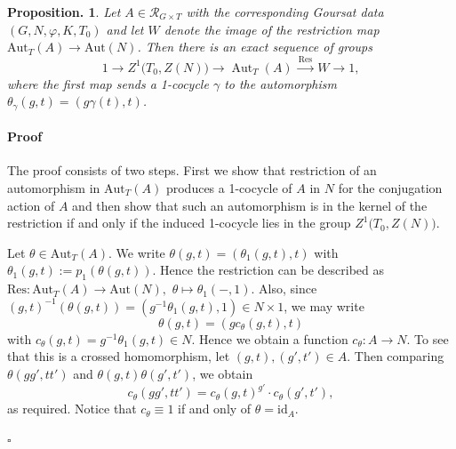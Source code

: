 \documentclass[12pt]{article}
\theoremstyle{change}
\newtheorem{prop}[theorem]{Proposition.}
\newenvironment{proof}{\paragraph{Proof}}{\hfill$\square$}
\newcommand{\Aut}{\mathrm{Aut}}
\newcommand{\calR}{\mathcal{R}}
\newcommand{\id}{\mathrm{id}}
\newcommand{\Res}{\mathrm{Res}}
\newcommand{\1}{{\bf 1}}
\begin{document}
\begin{prop}\label{prop: autta}
    Let $A\in\calR_{G\times T}$ with the corresponding Goursat data $(G, N, \varphi, K, T_0)$ and let $W$ denote the image of the restriction map $\Aut_T(A)\to \Aut(N)$. Then there is an exact sequence of groups
    \[
    1\longrightarrow Z^1\bigl(T_0,Z(N)\bigr)\longrightarrow\operatorname{Aut}_T(A) \xrightarrow{\ \Res\ }W\longrightarrow 1,
    \]
    where the first map sends a 1-cocycle $\gamma$ to the automorphism $\theta_\gamma(g, t) = (g\gamma(t), t)$.
\end{prop}
\begin{proof}
    The proof consists of two steps. First we show that restriction of an automorphism in $\Aut_T(A)$ produces a 1-cocycle of $A$ in $N$ for the conjugation action of $A$ and then show that such an automorphism is in the kernel of the restriction if and only if the induced 1-cocycle lies in the group $Z^1\bigl(T_0,Z(N))$. 

     Let $\theta\in \Aut_T(A)$. We write $\theta(g,t) = (\theta_1(g,t), t)$ with $\theta_1(g,t):= p_1(\theta(g,t))$. Hence the restriction can be described as $\Res : \Aut_T(A)\to \Aut(N),$ $\theta\mapsto \theta_1(- , 1)$. Also, since $(g,t)^{-1}(\theta(g,t)) = 
    (g^{-1}\theta_1(g,t), 1)\in N\times 1$, we may write
    \[
    \theta(g,t) = (g c_\theta(g,t), t)
    \]
    with $c_\theta(g,t) = g^{-1}\theta_1(g,t)\in N$. Hence we obtain a function $c_\theta: A\to N$. To see that this is a crossed homomorphism, let $(g,t), (g', t')\in A$. Then comparing $\theta(gg',tt')$ and $\theta(g,t)\theta(g',t')$, we obtain
    \begin{equation}\label{eq: c-theta}
    c_\theta(gg', tt') = c_\theta(g,t)^{g'}\cdot c_\theta(g',t'),
    \end{equation}
    as required. Notice that $c_\theta \equiv 1$ if and only of $\theta = \id_A$. 


\end{proof}
\end{document}
